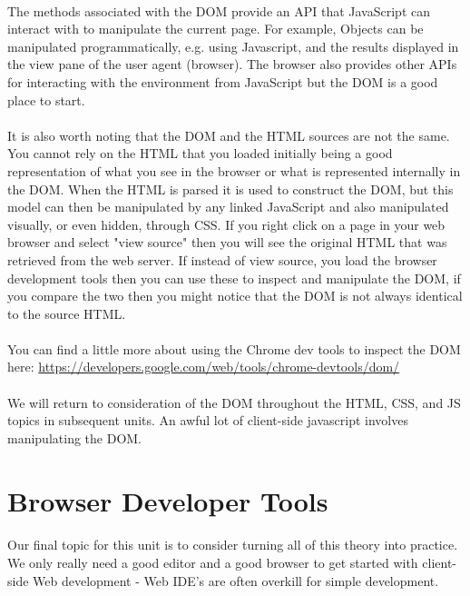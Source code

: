 \paragraph{} The methods associated with the DOM provide an API that JavaScript can interact with to manipulate the current page. For example, Objects can be manipulated programmatically, e.g. using Javascript, and the results displayed in the view pane of the user agent (browser). The browser also provides other APIs for interacting with the environment from JavaScript but the DOM is a good place to start.
\paragraph{} It is also worth noting that the DOM and the HTML sources are not the same. You cannot rely on the HTML that you loaded initially being a good representation of what you see in the browser or what is represented internally in the DOM. When the HTML is parsed it is used to construct the DOM, but this model can then be manipulated by any linked JavaScript and also manipulated visually, or even hidden, through CSS. If you right click on a page in your web browser and select "view source" then you will see the original HTML that was retrieved from the web server. If instead of view source, you load the browser development tools then you can use these to inspect and manipulate the DOM, if you compare the two then you might notice that the DOM is not always identical to the source HTML.
\paragraph{} You can find a little more about using the Chrome dev tools to inspect the DOM here:
	\url{https://developers.google.com/web/tools/chrome-devtools/dom/}
\paragraph{} We will return to consideration of the DOM throughout the HTML, CSS, and JS topics in subsequent units. An awful lot of client-side javascript involves manipulating the DOM.

\section{Browser Developer Tools}
\paragraph{} Our final topic for this unit is to consider turning all of this theory into practice. We only really need a good editor and a good browser to get started with client-side Web development - Web IDE’s are often overkill for simple development.
